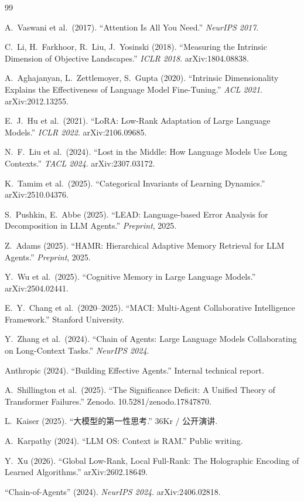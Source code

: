 \documentclass[11pt,a4paper]{ctexart}
\begin{document}
\begin{thebibliography}{99}

A.~Vaswani et al.\ (2017).
``Attention Is All You Need.''
\textit{NeurIPS 2017}.

C.~Li, H.~Farkhoor, R.~Liu, J.~Yosinski (2018).
``Measuring the Intrinsic Dimension of Objective Landscapes.''
\textit{ICLR 2018}. arXiv:1804.08838.

A.~Aghajanyan, L.~Zettlemoyer, S.~Gupta (2020).
``Intrinsic Dimensionality Explains the Effectiveness of Language Model Fine-Tuning.''
\textit{ACL 2021}. arXiv:2012.13255.

E.~J.~Hu et al.\ (2021).
``LoRA: Low-Rank Adaptation of Large Language Models.''
\textit{ICLR 2022}. arXiv:2106.09685.

N.~F.~Liu et al.\ (2024).
``Lost in the Middle: How Language Models Use Long Contexts.''
\textit{TACL 2024}. arXiv:2307.03172.

K.~Tamim et al.\ (2025).
``Categorical Invariants of Learning Dynamics.''
arXiv:2510.04376.

S.~Pushkin, E.~Abbe (2025).
``LEAD: Language-based Error Analysis for Decomposition in LLM Agents.''
\textit{Preprint}, 2025.

Z.~Adams (2025).
``HAMR: Hierarchical Adaptive Memory Retrieval for LLM Agents.''
\textit{Preprint}, 2025.

Y.~Wu et al.\ (2025).
``Cognitive Memory in Large Language Models.''
arXiv:2504.02441.

E.~Y.~Chang et al.\ (2020--2025).
``MACI: Multi-Agent Collaborative Intelligence Framework.''
Stanford University.

Y.~Zhang et al.\ (2024).
``Chain of Agents: Large Language Models Collaborating on Long-Context Tasks.''
\textit{NeurIPS 2024}.

Anthropic (2024).
``Building Effective Agents.''
Internal technical report.

A.~Shillington et al.\ (2025).
``The Significance Deficit: A Unified Theory of Transformer Failures.''
Zenodo. 10.5281/zenodo.17847870.

L.~Kaiser (2025).
``大模型的第一性思考.'' 36Kr / 公开演讲.

A.~Karpathy (2024).
``LLM OS: Context is RAM.''
Public writing.

Y.~Xu (2026).
``Global Low-Rank, Local Full-Rank: The Holographic Encoding of Learned Algorithms.''
arXiv:2602.18649.

``Chain-of-Agents'' (2024).
\textit{NeurIPS 2024}. arXiv:2406.02818.

\end{thebibliography}
\end{document}
